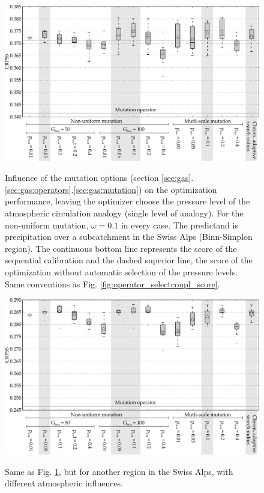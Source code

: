 \documentclass{ametsoc}
\begin{document}
\begin{figure}[t]
	\begin{center}
		\noindent\includegraphics[width=33pc,angle=0]{fig07.pdf}\\
	\end{center}
	\caption{Influence of the mutation options (section \ref{sec:gas}.\ref{sec:gas:operators}.\ref{sec:gas:mutation}) on the optimization performance, leaving the optimizer choose the pressure level of the atmospheric circulation analogy (single level of analogy). For the non-uniform mutation, $\omega=0.1$ in every case. The predictand is precipitation over a subcatchment in the Swiss Alps (Binn-Simplon region). The continuous bottom line represents the score of the sequential calibration and the dashed superior line, the score of the optimization without automatic selection of the pressure levels. Same conventions as Fig. \ref{fig:operator_selectcoupl_score}.}
	\label{fig:operator_mutation_score_atmlevel}
\end{figure}

\begin{figure}[t]
	\begin{center}
		\noindent\includegraphics[width=33pc,angle=0]{fig08.pdf}\\
	\end{center}
	\caption{Same as Fig. \ref{fig:operator_mutation_score_atmlevel}, but for another region in the Swiss Alps, with different atmospheric influences.}
	\label{fig:operator_mutation_score_rhoneamont}
\end{figure}
\end{document}
